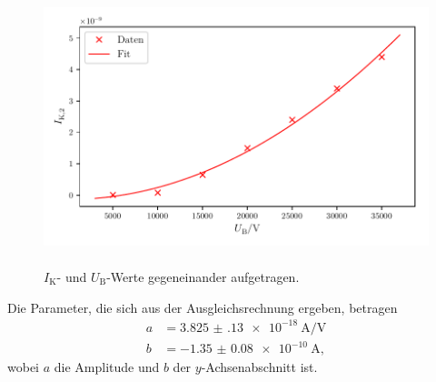 \begin{figure}
    \centering
    \includegraphics[width=15cm, height=8cm]{build/plot4.pdf}
    \caption{$I_\text{K}$- und $U_\text{B}$-Werte gegeneinander aufgetragen.}
    \label{fig:plot4}
\end{figure}

\noindent Die Parameter, die sich aus der Ausgleichsrechnung ergeben, betragen
\begin{align*}
    a &= \SI{3.825(130)e-18}{\ampere\per\volt}\\
    b &= \SI{-1.35(8)e-10}{\ampere},
\end{align*}
wobei $a$ die Amplitude und $b$ der $y$-Achsenabschnitt ist.